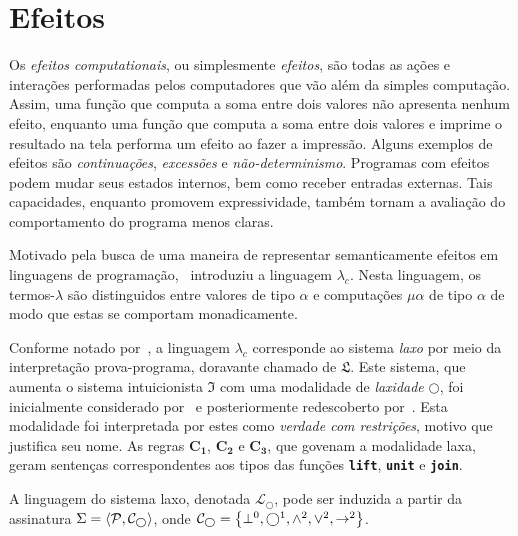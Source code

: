 \section{Efeitos}

Os \emph{efeitos computationais}, ou simplesmente \emph{efeitos}, são todas as ações e interações performadas pelos computadores que vão além da simples computação.
Assim, uma função que computa a soma entre dois valores não apresenta nenhum efeito, enquanto uma função que computa a soma entre dois valores e imprime o resultado na tela performa um efeito ao fazer a impressão.
Alguns exemplos de efeitos são \emph{continuações}, \emph{excessões} e \emph{não-determinismo}.
Programas com efeitos podem mudar seus estados internos, bem como receber entradas externas.
Tais capacidades, enquanto promovem expressividade, também tornam a avaliação do comportamento do programa menos claras.

\vspace{.3\baselineskip}
Motivado pela busca de uma maneira de representar semanticamente efeitos em linguagens de programação,~\cite{Moggi} introduziu a linguagem $\lambda_c$.
Nesta linguagem, os termos-$\lambda$ são distinguidos entre valores de tipo $\alpha$ e computações $\mu\alpha$ de tipo $\alpha$ de modo que estas se comportam monadicamente.

\vspace{.3\baselineskip}
Conforme notado por~\cite{Benton}, a linguagem $\lambda_c$ corresponde ao sistema \emph{laxo} por meio da interpretação prova-programa, doravante chamado de $\mathfrak{L}$.
Este sistema, que aumenta o sistema intuicionista $\mathfrak{I}$ com uma modalidade de \emph{laxidade} $\bigcirc$, foi inicialmente considerado por~\cite{Curry-A} e posteriormente redescoberto por~\cite{Fairtlough}.
Esta modalidade foi interpretada por estes como \emph{verdade com restrições}, motivo que justifica seu nome.
As regras $\mathbf{C_1}$, $\mathbf{C_2}$ e $\mathbf{C_3}$, que govenam a modalidade laxa, geram sentenças correspondentes aos tipos das funções {\footnotesize\texttt{\textbf{lift}}}, {\footnotesize\texttt{\textbf{unit}}} e {\footnotesize\texttt{\textbf{join}}}.

\vspace{\baselineskip}
\begin{tcolorbox}[enhanced jigsaw, breakable, sharp corners, colframe=black, colback=white, boxrule=0.5pt, left=1.5mm, right=1.5mm, top=1.5mm, bottom=1.5mm]
\begin{definition}\label{lax.language}
    A linguagem do sistema laxo, denotada $\mathcal{L}_\bigcirc$, pode ser induzida a partir da assinatura $\Sigma=\langle\mathcal{P},\mathcal{C}_\bigcirc\rangle$, onde $\mathcal{C}_\bigcirc=\left\{\bot^0,\bigcirc^1,\wedge^2,\vee^2,\to^2\right\}$.
\end{definition}
\end{tcolorbox}

